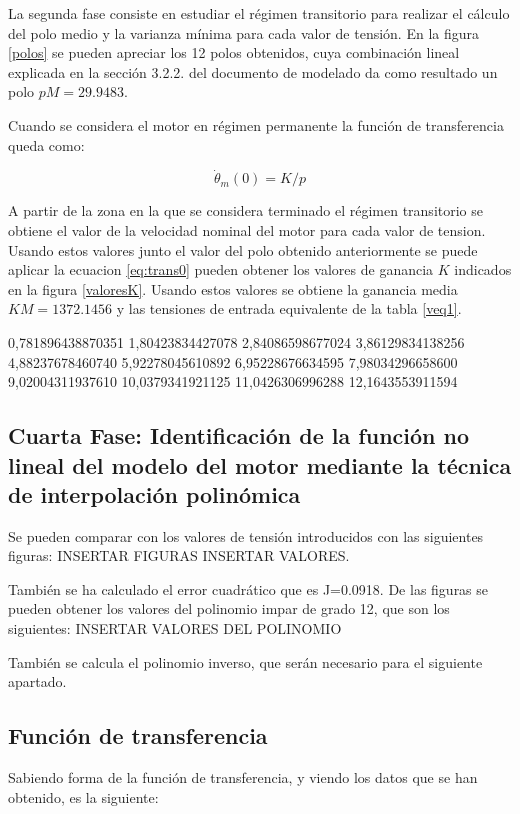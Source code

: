 \documentclass[a4paper]{article}
\begin{document}
La segunda fase consiste en estudiar el régimen transitorio para realizar el cálculo del polo medio y la varianza mínima para cada valor de tensión.
En la figura \ref{polos} se pueden apreciar los 12 polos obtenidos, cuya combinación lineal explicada en la sección 3.2.2. del documento de modelado\cite{modelado}
da como resultado un polo $pM=29.9483$.

Cuando se considera el motor en régimen permanente la función de transferencia queda como:

\begin{equation}
	\label{eq:trans0}
	\dot{\theta}_m (0) = K/p
\end{equation}

A partir de la zona en la que se considera terminado el régimen transitorio se obtiene el valor de la velocidad nominal del motor para cada valor de tension.
Usando estos valores junto el valor del polo obtenido anteriormente se puede aplicar la ecuacion \ref{eq:trans0} pueden obtener los valores de ganancia $K$ indicados en la
figura \ref{valoresK}.
Usando estos valores se obtiene la ganancia media $KM=1372.1456$ y las tensiones de entrada equivalente de la tabla \ref{veq1}.

0,781896438870351	1,80423834427078	2,84086598677024	3,86129834138256	4,88237678460740	5,92278045610892	6,95228676634595	7,98034296658600	9,02004311937610	10,0379341921125	11,0426306996288	12,1643553911594

\subsection{Cuarta Fase: Identificación de la función no lineal del modelo del motor mediante
la técnica de interpolación polinómica}

Se pueden comparar con los valores de tensión introducidos con las siguientes figuras:
INSERTAR FIGURAS INSERTAR VALORES.

También se ha calculado el error cuadrático que es J=0.0918. De las figuras se pueden obtener los valores del polinomio impar de grado 12, que son
los siguientes:
INSERTAR VALORES DEL POLINOMIO

También se calcula el polinomio inverso, que serán necesario para el siguiente apartado.

\subsection{Función de transferencia}
Sabiendo forma de la función de transferencia, y viendo los datos que se han obtenido, es la siguiente:
\end{document}
